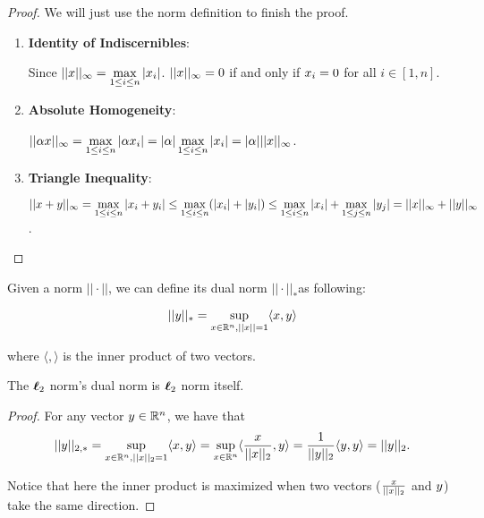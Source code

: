 \documentclass[../main.tex]{subfiles}
\begin{document}
\begin{proof} 
	We will just use the norm definition to finish the proof.
	\begin{enumerate}
		\item \textbf{Identity of Indiscernibles}: 
		
		Since $||x||_\infty = \max\limits_{1 \leq i \leq n} |x_i|$. $||x||_\infty = 0 $ if and only if $x_i = 0$ for all $i \in [1, n]$.
		\item \textbf{Absolute Homogeneity}: 
		
		$||\alpha x||_\infty = \max\limits_{1 \leq i \leq n}  |\alpha x_i| = |\alpha| \max\limits_{1 \leq i \leq n}  |x_i| = |\alpha| ||x||_\infty$.
		\item \textbf{Triangle Inequality}: 
		
		$||x + y||_\infty = \max\limits_{1 \leq i \leq n}  |x_i + y_i|  \leq \max\limits_{1 \leq i \leq n} ( |x_i| + |y_i|)  \leq \max\limits_{1 \leq i \leq n}  |x_i| +\max\limits_{1 \leq j \leq n}  |y_j| = ||x||_\infty + ||y||_\infty$.
	\end{enumerate}
\end{proof}

\begin{definition}
	Given a norm $||\cdot||$, we can define its dual norm $||\cdot||_{*}$as following:
	
	\begin{equation}
		||y||_* = \sup\limits_{x \in \mathbb{R}^n, ||x|| = 1} \langle x, y \rangle
	\end{equation}
	
	where $\langle, \rangle$ is the inner product of two vectors.
\end{definition}

\begin{claim}
	The $\boldsymbol{\ell}_2$ norm's dual norm is $\boldsymbol{\ell}_2$ norm itself.
\end{claim}

\begin{proof}
	For any vector $y \in \mathbb{R}^n$, we have that
	\begin{equation*}
	||y||_{2,*} = \sup\limits_{x \in \mathbb{R}^n, ||x||_2 = 1} \langle x, y \rangle = \sup\limits_{x \in \mathbb{R}^n} \langle \frac{x}{||x||_2}, y \rangle = \frac{1}{||y||_2} \langle y, y \rangle = ||y||_2. 
	\end{equation*}
	
	Notice that here the inner product is maximized when two vectors ($\frac{x}{||x||_2}$ and $y$) take the same direction.
\end{proof}
\end{document}
